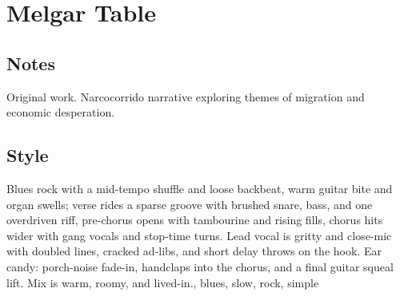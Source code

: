 \section{Melgar Table}

\subsection{Notes}
Original work.
Narcocorrido narrative exploring themes of migration and economic desperation.

\subsection{Style}
Blues rock with a mid-tempo shuffle and loose backbeat, warm guitar bite and organ swells; verse rides a sparse groove with brushed snare, bass, and one overdriven riff, pre-chorus opens with tambourine and rising fills, chorus hits wider with gang vocals and stop-time turns. Lead vocal is gritty and close-mic with doubled lines, cracked ad-libs, and short delay throws on the hook. Ear candy: porch-noise fade-in, handclaps into the chorus, and a final guitar squeal lift. Mix is warm, roomy, and lived-in., blues, slow, rock, simple

